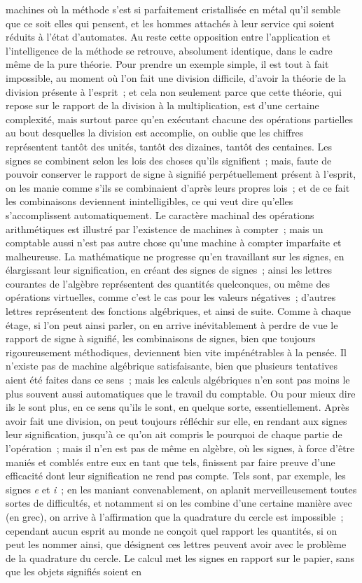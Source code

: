 \documentclass[french,twoside]{book} %
\begin{document}
machines où la méthode s'est si parfaitement cristallisée en métal qu’il semble que ce soit elles qui pensent, et les hommes attachés à leur service qui soient réduits à l'état d'automates. Au reste cette opposition entre l'application et l'intelligence de la méthode se retrouve, absolument identique, dans le cadre même de la pure théorie. Pour prendre un exemple simple, il est tout à fait impossible, au moment où l'on fait une division difficile, d'avoir la théorie de la division présente à l'esprit ; et cela non seulement parce que cette théorie, qui repose sur le rapport de la division à la multiplication, est d'une certaine complexité, mais surtout parce qu'en exécutant chacune des opérations partielles au bout desquelles la division est accomplie, on oublie que les chiffres représentent tantôt des unités, tantôt des dizaines, tantôt des centaines. Les signes se combinent selon les lois des choses qu'ils signifient ; mais, faute de pouvoir conserver le rapport de signe à signifié perpétuellement présent à l'esprit, on les manie comme s'ils se combinaient d'après leurs propres lois ; et de ce fait les combinaisons deviennent inintelligibles, ce qui veut dire qu'elles s'accomplissent automatiquement. Le caractère machinal des opérations arithmétiques est illustré par l'existence de machines à compter ; mais un comptable aussi n'est pas autre chose qu'une machine à compter imparfaite et malheureuse. La mathématique ne progresse qu'en travaillant sur les signes, en élargissant leur signification, en créant des signes de signes ; ainsi les lettres courantes de l'algèbre représentent des quantités quelconques, ou même des opérations virtuelles, comme c'est le cas pour les valeurs négatives ; d'autres lettres représentent des fonctions algébriques, et ainsi de suite. Comme à chaque étage, si l'on peut ainsi parler, on en arrive inévitablement à perdre de vue le rapport de signe à signifié, les combinaisons de signes, bien que toujours rigoureusement méthodiques, deviennent bien vite impénétrables à la pensée. Il n'existe pas de machine algébrique satisfaisante, bien que plusieurs tentatives aient été faites dans ce sens ; mais les calculs algébriques n'en sont pas moins le plus souvent aussi automatiques que le travail du comptable. Ou pour mieux dire ils le sont plus, en ce sens qu'ils le sont, en quelque sorte, essentiellement. Après avoir fait une division, on peut toujours réfléchir sur elle, en rendant aux signes leur signification, jusqu'à ce qu'on ait compris le pourquoi de chaque partie de l'opération ; mais il n'en est pas de même en algèbre, où les signes, à force d'être maniés et comblés entre eux en tant que tels, finissent par faire preuve d'une efficacité dont leur signification ne rend pas compte. Tels sont, par exemple, les signes {\itshape e} et {\itshape i} ; en les maniant convenablement, on aplanit merveilleusement toutes sortes de difficultés, et notamment si on les combine d'une certaine manière avec (en grec), on arrive à l'affirmation que la quadrature du cercle est impossible ; cependant aucun esprit au monde ne conçoit quel rapport les quantités, si on peut les nommer ainsi, que désignent ces lettres peuvent avoir avec le problème de la quadrature du cercle. Le calcul met les signes en rapport sur le papier, sans que les objets signifiés soient en 
\end{document}
